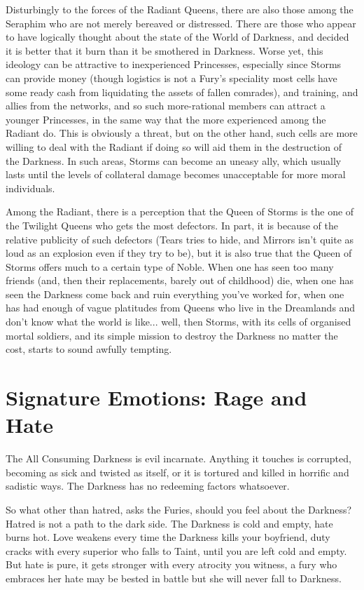 Disturbingly to the forces of the Radiant Queens, there are also those among the Seraphim who are not merely bereaved or distressed. There are those who appear to have logically thought about the state of the World of Darkness, and decided it is better that it burn than it be smothered in Darkness. Worse yet, this ideology can be attractive to inexperienced Princesses, especially since Storms can provide money (though logistics is not a Fury's speciality most cells have some ready cash from liquidating the assets of fallen comrades), and training, and allies from the networks, and so such more-rational members can attract a younger Princesses, in the same way that the more experienced among the Radiant do. This is obviously a threat, but on the other hand, such cells are more willing to deal with the Radiant if doing so will aid them in the destruction of the Darkness. In such areas, Storms can become an uneasy ally, which usually lasts until the levels of collateral damage becomes unacceptable for more 
moral individuals.

Among the Radiant, there is a perception that the Queen of Storms is the one of the Twilight Queens who gets the most defectors. In part, it is because of the relative publicity of such defectors (Tears tries to hide, and Mirrors isn't quite as loud as an explosion even if they try to be), but it is also true that the Queen of Storms offers much to a certain type of Noble. When one has seen too many friends (and, then their replacements, barely out of childhood) die, when one has seen the Darkness come back and ruin everything you've worked for, when one has had enough of vague platitudes from Queens who live in the Dreamlands and don't know what the world is like... well, then Storms, with its cells of organised mortal soldiers, and its simple mission to destroy the Darkness no matter the cost, starts to sound awfully tempting. 

\section*{Signature Emotions: Rage and Hate}

The All Consuming Darkness is evil incarnate. Anything it touches is corrupted, becoming as sick and twisted as itself, or it is tortured and killed in horrific and sadistic ways. The Darkness has no redeeming factors whatsoever. 

So what other than hatred, asks the Furies, should you feel about the Darkness? Hatred is not a path to the dark side. The Darkness is cold and empty, hate burns hot. Love weakens every time the Darkness kills your boyfriend, duty cracks with every superior who falls to Taint, until you are left cold and empty. But hate is pure, it gets stronger with every atrocity you witness, a fury who embraces her hate may be bested in battle but she will never fall to Darkness. 

